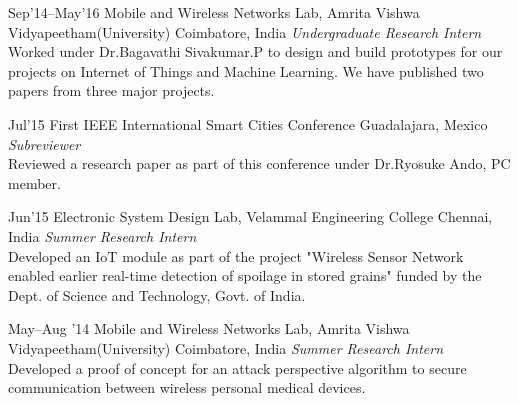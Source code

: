 \documentclass[]{friggeri-cv} %
\begin{document}
\begin{entrylist}


\entry
{Sep'14--May'16}
{Mobile and Wireless Networks Lab, Amrita Vishwa Vidyapeetham(University)}
{Coimbatore, India}
{\emph{Undergraduate Research Intern} \\
Worked under Dr.Bagavathi Sivakumar.P to design and build prototypes for our projects on Internet of Things and Machine Learning. We have published two papers from three major projects. }

\entry
{Jul'15}
{First IEEE International Smart Cities Conference}
{Guadalajara, Mexico}
{\emph{Subreviewer} \\
Reviewed a research paper as part of this conference under Dr.Ryosuke Ando, PC member.}

\entry
{Jun'15}
{Electronic System Design Lab, Velammal Engineering College}
{Chennai, India}
{\emph{Summer Research Intern} \\
Developed an IoT module as part of the project "Wireless Sensor Network enabled earlier real-time detection of spoilage in stored grains" funded by the Dept. of Science and Technology, Govt. of India.}

\entry
{May--Aug '14}
{Mobile and Wireless Networks Lab, Amrita Vishwa Vidyapeetham(University)}
{Coimbatore, India}
{\emph{Summer Research Intern} \\
Developed a proof of concept for an attack perspective algorithm to secure communication between wireless personal medical devices.}

\end{entrylist}

\end{document}

